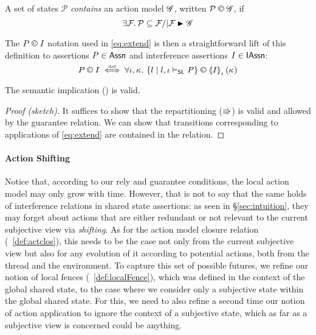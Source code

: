 \begin{definition}
  A set of states $\mathcal P$ \emph{contains} an action model
  $\mathscr{G}$, written $\mathcal P \containI \gmod$, if
  \[
  \E{\fence{}} \mathcal P\subseteq \fence{} /| \fence{} \strictfences \gmod
  \]
\end{definition}

The $P\containI I$ notation used in \eqref{eq:extend} is then a
straightforward lift of this definition to assertions $P \in
\textsf{Assn}$ and interference assertions $I \in \textsf{IAssn}$:
\[
P \containI I \iffdef \for{\lenv, \ca{}} \left\{l \mid l, \lenv \slsat P \right\} \containI \semI[\lenv]{I}(\ca{})
\]

\begin{lemma}
  The semantic implication (\extendRule) is valid.
\end{lemma}
\begin{proof}[Proof (sketch)]
  It suffices to show that the repartitioning ($\Rrightarrow$) is valid
  and allowed by the guarantee relation. We can show that transitions
  corresponding to applications of \eqref{eq:extend} are contained in
  the \extendG relation.
\end{proof}


\paragraph{Action Shifting}
Notice that, according to our rely and guarantee conditions, the local
action model may only grow with time. However, that is not to say that
the same holds of interference relations in shared state assertions:
as seen in \S\ref{sec:intuition}, they may forget about actions that
are either redundant or not relevant to the current subjective
view via \emph{shifting}. As for the action model closure relation
(~\ref{def:actclos}), this needs to be the case not only
from the current subjective view but also for any evolution of it
according to potential actions, both from the thread and the
environment. To capture this set of possible futures, we refine our
notion of local fences (~\ref{def:localFence}), which was
defined in the context of the global shared state, to the case where
we consider only a subjective state within the global shared state.
For this, we need to also refine a second time our notion of action
application to ignore the context of a subjective state, which as far
as a subjective view is concerned could be anything.

